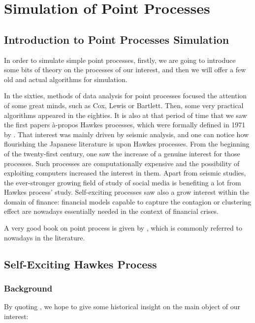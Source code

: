 
\part{Simulation of Point Processes}
\chapter{Introduction to Point Processes Simulation}
In order to simulate simple point processes, firstly, we are going to introduce some bits of theory on the processes of our interest, and then we will offer a few old and actual algorithms for simulation. 

In the sixties, methods of data analysis for point processes focused the attention of some great minds, such as Cox, Lewis or Bartlett. Then, some very practical algorithms appeared in the eighties. It is also at that period of time that we saw the first papers à-propos Hawkes processes, which were formally defined in 1971 by \cite{Hawkes}. That interest was mainly driven by seismic analysis, and one can notice how flourishing the Japanese literature is upon Hawkes processes. From the beginning of the twenty-first century, one saw the increase of a genuine interest for those processes. Such processes are computationally expensive and the possibility of exploiting computers increased the interest in them. Apart from seismic studies, the ever-stronger growing field of study of social media is benefiting a lot from Hawkes process' study. Self-exciting processes saw also a grow interest within the domain of finance: financial models capable to capture the contagion or clustering effect are nowadays essentially needed in the context of financial crises.

A very good book on point process is given by \cite{daley}, which is commonly referred to nowadays in the literature.

\chapter{Self-Exciting Hawkes Process}
\section{Background}
By quoting \cite{simullaub}, we hope to give some historical insight on the main object of our interest:

